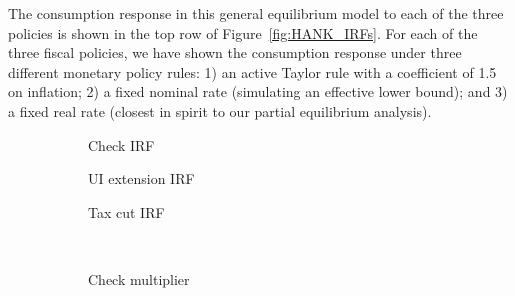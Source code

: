 \documentclass[qe,draft]{econsocart}
\theoremstyle{plain}
\theoremstyle{definition}
\begin{document}
The consumption response in this general equilibrium model to each of the three policies is shown in the top row of Figure~\ref{fig:HANK_IRFs}. For each of the three fiscal policies, we have shown the consumption response under three different monetary policy rules: 1) an active Taylor rule with a coefficient of 1.5 on inflation; 2) a fixed nominal rate (simulating an effective lower bound); and 3) a fixed real rate (closest in spirit to our partial equilibrium analysis).


\begin{figure}[H]
  \centering
  \caption{\pregenmark General equilibrium policy comparison in HANK-SAM model}
  \label{fig:HANK_IRFs} %
  \noindent\begin{minipage}{\textwidth}
    \centering
    \begin{subfigure}[b]{.30\linewidth}
      \centering
      \caption{Check IRF}
      \label{fig:hank_stimulus_irf} %
    \end{subfigure}
    \begin{subfigure}[b]{.30\linewidth}
      \centering
      \caption{UI extension IRF}
      \label{fig:hank_UI_irf} %
    \end{subfigure}
    \begin{subfigure}[b]{.30\linewidth}
      \centering
      \caption{Tax cut IRF}
      \label{fig:hank_tax_irf} %
    \end{subfigure}
    \\[1em]
    \begin{subfigure}[b]{.30\linewidth}
      \centering
      \caption{Check multiplier}
      \label{fig:HANK_transfer_multiplier} %
    \end{subfigure}
    \begin{subfigure}[b]{.30\linewidth}
      \centering

\end{subfigure}
\end{minipage}
\end{figure}
\end{document}
